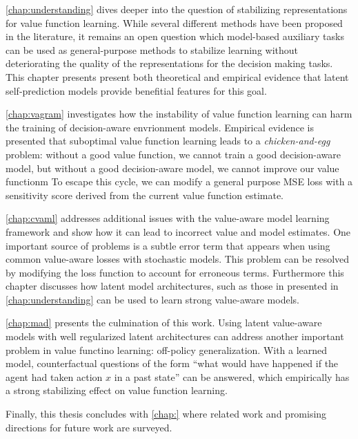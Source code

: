 \autoref{chap:understanding} dives deeper into the question of stabilizing representations for value function learning.
While several different methods have been proposed in the literature, it remains an open question which model-based auxiliary tasks can be used as general-purpose methods to stabilize learning without deteriorating the quality of the representations for the decision making tasks.
This chapter presents present both theoretical and empirical evidence that latent self-prediction models provide benefitial features for this goal.

\autoref{chap:vagram} investigates how the instability of value function learning can harm the training of decision-aware envrionment models.
Empirical evidence is presented that suboptimal value function learning leads to a \emph{chicken-and-egg} problem: without a good value function, we cannot train a good decision-aware model, but without a good decision-aware model, we cannot improve our value functionm
To escape this cycle, we can modify a general purpose MSE loss with a sensitivity score derived from the current value function estimate.

\autoref{chap:cvaml} addresses additional issues with the value-aware model learning framework and show how it can lead to incorrect value and model estimates.
One important source of problems is a subtle error term that appears when using common value-aware losses with stochastic models.
This problem can be resolved by modifying the loss function to account for erroneous terms.
Furthermore this chapter discusses how latent model architectures, such as those in presented in \autoref{chap:understanding} can be used to learn strong value-aware models.

\autoref{chap:mad} presents the culmination of this work.
Using latent value-aware models with well regularized latent architectures can address another important problem in value functino learning: off-policy generalization.
With a learned model, counterfactual questions of the form ``what would have happened if the agent had taken action $x$ in a past state'' can be answered, which empirically has a strong stabilizing effect on value function learning.

Finally, this thesis concludes with \autoref{chap:} where related work and promising directions for future work are surveyed.


